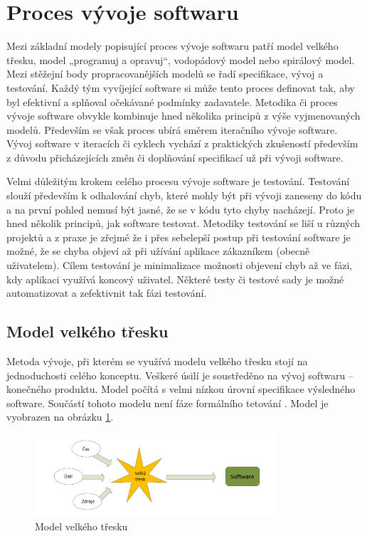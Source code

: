 \section{Proces vývoje softwaru}
Mezi základní modely popisující proces vývoje softwaru patří model velkého třesku, model „programuj a opravuj“, vodopádový model nebo spirálový model. Mezi stěžejní body propracovanějších modelů se řadí specifikace, vývoj a testování. Každý tým vyvíjející software si může tento proces definovat tak, aby byl efektivní a splňoval očekávané podmínky zadavatele. Metodika či proces vývoje software obvykle kombinuje hned několika principů z výše vyjmenovaných modelů. Především se však proces ubírá směrem iteračního vývoje software. Vývoj software v iteracích či cyklech vychází z praktických zkušeností především z důvodu přicházejících změn či doplňování specifikací už při vývoji software.

Velmi důležitým krokem celého procesu vývoje software je testování. Testování slouží především k odhalování chyb, které mohly být při vývoji zaneseny do kódu a na první pohled nemusí být jasné, že se v kódu tyto chyby nacházejí. Proto je hned několik principů, jak software testovat. Metodiky testování se liší u různých projektů a z praxe je zřejmé že i přes sebelepší postup při testování software je možné, že se chyba objeví až při užívání aplikace zákazníkem (obecně uživatelem). Cílem testování je minimalizace možnosti objevení chyb až ve fázi, kdy aplikaci využívá koncový uživatel. Některé testy či testové sady je možné automatizovat a zefektivnit tak fázi testování.

\subsection{Model velkého třesku}
Metoda vývoje, při kterém se využívá modelu velkého třesku stojí na jednoduchosti celého konceptu. Veškeré úsilí je soustředěno na vývoj softwaru – konečného produktu. Model počítá s velmi nízkou úrovní specifikace výsledného software. Součástí tohoto modelu není fáze formálního tetování \cite{Patton2002}. Model je vyobrazen na obrázku \ref{fig:big-bang-model}.


\begin{figure}[!h]
	\centering
	\includegraphics[width=0.8\textwidth]{Figures/VelkyTresk.pdf}
	\caption{Model velkého třesku}
	\label{fig:big-bang-model}
\end{figure}
\newpage
